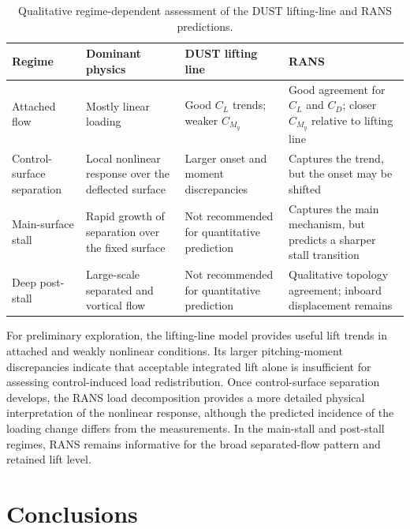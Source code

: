 \documentclass[journal ]{new-aiaa}
\begin{document}
\begin{table}[htbp]
    \centering
    \caption{Qualitative regime-dependent assessment of the DUST lifting-line and RANS predictions.}
    \label{tab:model_validity_summary}
    \begin{tabularx}{\linewidth}{>{\raggedright\arraybackslash}X>{\raggedright\arraybackslash}X>{\raggedright\arraybackslash}X>{\raggedright\arraybackslash}X}
        \hline
        \hline
        Regime
        & Dominant physics
        & DUST lifting line
        & RANS \\
        \hline
        Attached flow
        & Mostly linear loading
        & Good \(C_L\) trends; weaker \(C_{M_y}\)
        & Good agreement for \(C_L\) and \(C_D\); closer \(C_{M_y}\) relative to lifting line \\
        Control-surface separation
        & Local nonlinear response over the deflected surface
        & Larger onset and moment discrepancies
        & Captures the trend, but the onset may be shifted \\
        Main-surface stall
        & Rapid growth of separation over the fixed surface
        & Not recommended for quantitative prediction
        & Captures the main mechanism, but predicts a sharper stall transition \\
        Deep post-stall
        & Large-scale separated and vortical flow
        & Not recommended for quantitative prediction
        & Qualitative topology agreement; inboard displacement remains \\
        \hline
        \hline
    \end{tabularx}
\end{table}


For preliminary exploration, the lifting-line model provides useful lift trends in attached and weakly nonlinear conditions. Its larger pitching-moment discrepancies indicate that acceptable integrated lift alone is insufficient for assessing control-induced load redistribution.
Once control-surface separation develops, the RANS load decomposition provides a more detailed physical interpretation of the nonlinear response, although the predicted incidence of the loading change differs from the measurements.
In the main-stall and post-stall regimes, RANS remains informative for the broad separated-flow pattern and retained lift level.

\section{Conclusions}
\label{sec:conclusions}
\end{document}
